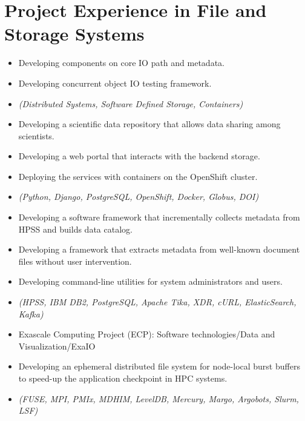\section{Project Experience in File and Storage Systems}

\begin{itemize}
    \item {Developing components on core IO path and metadata.}
    \item {Developing concurrent object IO testing framework.}
    \item {\it\small(Distributed Systems, Software Defined Storage, Containers) }
\end{itemize}

\begin{itemize}
    \item {Developing a scientific data repository that allows data sharing among scientists.}
    \item {Developing a web portal that interacts with the backend storage.}
    \item {Deploying the services with containers on the OpenShift cluster.}
    \item {\it\small(Python, Django, PostgreSQL, OpenShift, Docker, Globus, DOI) }
\end{itemize}

\begin{itemize}
    \item {Developing a software framework that incrementally collects metadata from HPSS and builds data catalog.}
    \item {Developing a framework that extracts metadata from well-known document files without user intervention.}
    \item {Developing command-line utilities for system administrators and users.}
    \item {\it\small (HPSS, IBM DB2, PostgreSQL, Apache Tika, XDR, cURL, ElasticSearch, Kafka)}
\end{itemize}

\begin{itemize}
    \item {Exascale Computing Project (ECP): Software technologies/Data and Visualization/ExaIO}
    \item {Developing an ephemeral distributed file system for node-local burst buffers
           to speed-up the application checkpoint in HPC systems.}
    \item {\it\small (FUSE, MPI, PMIx, MDHIM, LevelDB, Mercury, Margo, Argobots, Slurm, LSF)}
\end{itemize}

